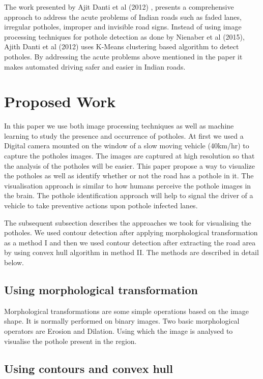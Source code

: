 \documentclass[journal]{IEEEtran}
\begin{document}
\vspace*{.5cm}

The work presented by Ajit Danti et al (2012) \cite{papertwo}, presents a comprehensive approach to address the acute problems of Indian roads such as faded lanes, irregular potholes, improper and invisible road signs. Instead of using image processing techniques for pothole detection as done by Nienaber et al (2015), Ajith Danti et al (2012) uses K-Means clustering based algorithm to detect potholes. By addressing the acute problems above mentioned in the paper it makes automated driving safer and easier in Indian roads. 

\section{Proposed Work}
In this paper we use both image processing techniques as well as machine learning to study the presence and occurrence of potholes. At first we used a Digital camera mounted on the window of a slow moving vehicle (40km/hr) to capture the potholes images. The images are captured at high resolution so that the analysis of the potholes will be easier. This paper propose a way to visualize the potholes as well as identify whether or not the road has a pothole in it. The visualisation approach is similar to how humans perceive the pothole images in the brain. The pothole identification approach will help to signal the driver of a vehicle to take preventive actions upon pothole infected lanes. 

The subsequent subsection describes the approaches we took for visualising the potholes. We used contour detection after applying morphological transformation as a method I and then we used contour detection after extracting the road area by using convex hull algorithm in method II. The methods are described in detail below.

\subsection{Using morphological transformation}

Morphological transformations are some simple operations based on the image shape. It is normally performed on binary images. Two basic morphological operators are Erosion and Dilation. Using which the image is analysed to visualise the pothole present in the region.


\subsection{Using contours and convex hull}
\end{document}
